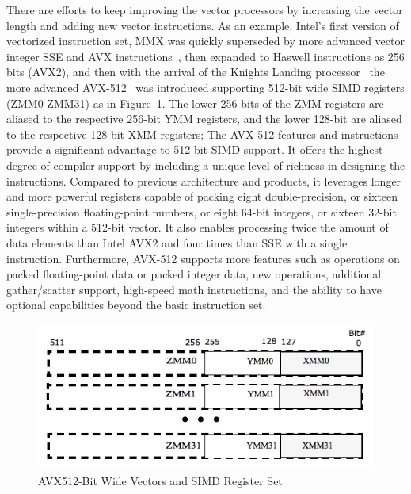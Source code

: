 \documentclass[5p,times,twocolumn]{elsarticle}
\begin{document}
There are efforts to keep improving the vector processors by increasing the vector
length and adding new vector instructions.
As an example, Intel's first version of vectorized instruction set, MMX was quickly superseded by more advanced vector integer SSE and AVX instructions~\cite{intelsse, intelavx, avxsets},
then expanded to Haswell instructions as 256 bits (AVX2),
and then with the arrival of the Knights Landing processor~\cite{avx-info} the more advanced
AVX-512~\cite{Intelref} was introduced supporting 512-bit wide SIMD registers (ZMM0-ZMM31)
as in Figure~\ref{fig:avxmms}. The lower 256-bits of the ZMM registers are
aliased to the respective 256-bit YMM registers, and the lower 128-bit are
aliased to the respective 128-bit XMM registers;
%
The AVX-512 features and instructions provide a significant advantage to 512-bit SIMD support.
It offers the highest degree of compiler support by including a unique level of richness
in designing the instructions.
%
Compared to previous architecture and products, it leverages longer and more
powerful registers capable of packing eight double-precision, or sixteen
single-precision floating-point numbers,
or eight 64-bit integers, or sixteen 32-bit integers within a 512-bit vector.
It also enables processing twice the amount of data elements than Intel AVX2 and four
times than SSE with a single instruction.
%
Furthermore,  AVX-512 supports more features such as operations on packed
floating-point data or packed integer data, new operations, additional
gather/scatter support, high-speed math instructions, and the ability to have
optional capabilities beyond the basic instruction set.

\begin{figure}[h]
    \centering
    \includegraphics[width=\linewidth]{avx_mms.png}
    \caption{AVX512-Bit Wide Vectors and SIMD Register Set}
    \label{fig:avxmms}
\end{figure}
\end{document}
